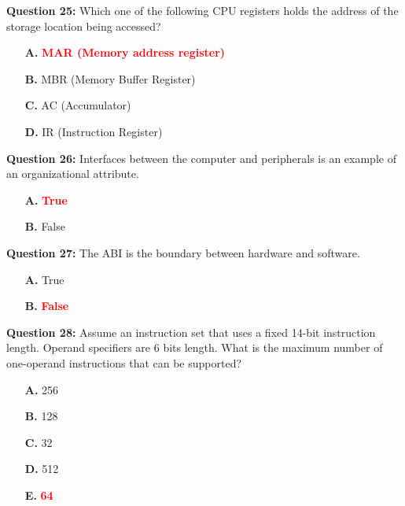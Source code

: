 \documentclass[12pt,a4paper]{article}
\begin{document}
\textbf{Question 25:} Which one of the following CPU registers holds the address of the storage location being accessed?

\begin{itemize}
    \item[\textbf{A.}] \textcolor{red}{\textbf{MAR (Memory address register)}}
    \item[\textbf{B.}] MBR (Memory Buffer Register)
    \item[\textbf{C.}] AC (Accumulator)
    \item[\textbf{D.}] IR (Instruction Register)
\end{itemize}

\vspace{0.5cm}

\textbf{Question 26:} Interfaces between the computer and peripherals is an example of an organizational attribute.

\begin{itemize}
    \item[\textbf{A.}] \textcolor{red}{\textbf{True}}
    \item[\textbf{B.}] False
\end{itemize}

\vspace{0.5cm}

\textbf{Question 27:} The ABI is the boundary between hardware and software.

\begin{itemize}
    \item[\textbf{A.}] True
    \item[\textbf{B.}] \textcolor{red}{\textbf{False}}
\end{itemize}

\vspace{0.5cm}

\textbf{Question 28:} Assume an instruction set that uses a fixed 14-bit instruction length. Operand specifiers are 6 bits length. What is the maximum number of one-operand instructions that can be supported?

\begin{itemize}
    \item[\textbf{A.}] 256
    \item[\textbf{B.}] 128
    \item[\textbf{C.}] 32
    \item[\textbf{D.}] 512
    \item[\textbf{E.}] \textcolor{red}{\textbf{64}}
\end{itemize}
\end{document}
